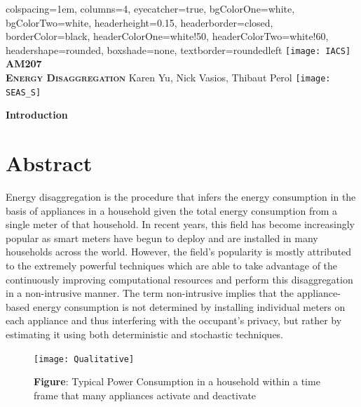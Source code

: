 \documentclass[landscape,fontscale=0.48,margin=2cm,paperwidth=135truecm,paperheight=89truecm]{baposter}
\begin{document}
\begin{poster}{
		colspacing=1em,
		columns=4,
        eyecatcher=true,
		bgColorOne=white,
		bgColorTwo=white,
		headerheight=0.15\textheight,
		headerborder=closed,
		borderColor=black,
		headerColorOne=white!50,
		headerColorTwo=white!60,
		headershape=rounded,
		boxshade=none,
		textborder=roundedleft
}
{\hspace{2em}\texttt{[image: IACS]}}
{\bfseries AM207\\[12pt] \textsc{Energy Disaggregation}}
{\vspace{1em}Karen Yu, Nick Vasios, Thibaut Perol}
{\hspace{-2em}\texttt{[image: SEAS\_S]}}


\vspace{2em}


%
\begin{posterbox}[column=0]{\LARGE \bfseries Introduction}
\section*{Abstract}
Energy disaggregation is the procedure that infers the energy consumption in the basis of appliances in a household given the total energy consumption from a single meter of that household. In recent years, this field has become increasingly popular as smart meters have begun to deploy and are installed in many households across the world. However, the field's popularity is mostly attributed to the extremely powerful techniques which are able to take advantage of the continuously improving computational resources and perform this disaggregation in a non-intrusive manner. The term non-intrusive implies that the appliance-based energy consumption is not determined by installing individual meters on each appliance and thus interfering with the occupant's privacy, but rather by estimating it using both deterministic and stochastic techniques.
\begin{figure}
\begin{center}
\texttt{[image: Qualitative]}
\caption*{\footnotesize  \textbf{Figure}: Typical Power Consumption in a household within a time frame that many appliances activate and deactivate} \vspace*{-1 cm}
\end{center}
\end{figure}


\end{posterbox}
\end{poster}
\end{document}
